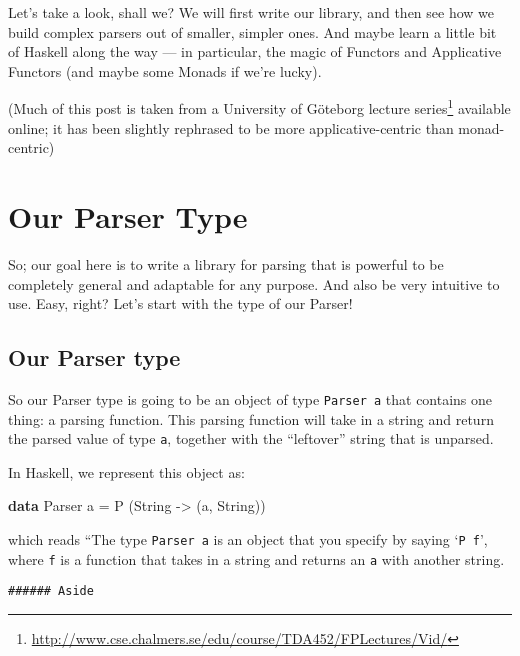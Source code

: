 \documentclass[]{article}
\newenvironment{Shaded}{}{}
\newcommand{\KeywordTok}[1]{\textcolor[rgb]{0.00,0.44,0.13}{\textbf{{#1}}}}
\newcommand{\DataTypeTok}[1]{\textcolor[rgb]{0.56,0.13,0.00}{{#1}}}
\newcommand{\OtherTok}[1]{\textcolor[rgb]{0.00,0.44,0.13}{{#1}}}
\newcommand{\FunctionTok}[1]{\textcolor[rgb]{0.02,0.16,0.49}{{#1}}}
\newcommand{\NormalTok}[1]{{#1}}
\renewcommand{\href}[2]{#2\footnote{\url{#1}}}
\begin{document}
Let's take a look, shall we? We will first write our library, and then see how we build complex
parsers out of smaller, simpler ones. And maybe learn a little bit of Haskell along the way --- in
particular, the magic of Functors and Applicative Functors (and maybe some Monads if we're lucky).

(Much of this post is taken from a University of Göteborg
\href{http://www.cse.chalmers.se/edu/course/TDA452/FPLectures/Vid/}{lecture series} available
online; it has been slightly rephrased to be more applicative-centric than monad-centric)

\section{Our Parser Type}\label{our-parser-type}

So; our goal here is to write a library for parsing that is powerful to be completely general and
adaptable for any purpose. And also be very intuitive to use. Easy, right? Let's start with the type
of our Parser!

\subsection{Our Parser type}\label{our-parser-type-1}

So our Parser type is going to be an object of type \texttt{Parser\ a} that contains one thing: a
parsing function. This parsing function will take in a string and return the parsed value of type
\texttt{a}, together with the ``leftover'' string that is unparsed.

In Haskell, we represent this object as:

\begin{Shaded}
\begin{Highlighting}[]
\KeywordTok{data} \DataTypeTok{Parser} \NormalTok{a }\FunctionTok{=} \DataTypeTok{P} \NormalTok{(}\DataTypeTok{String} \OtherTok{->} \NormalTok{(a, }\DataTypeTok{String}\NormalTok{))}
\end{Highlighting}
\end{Shaded}

which reads ``The type \texttt{Parser\ a} is an object that you specify by saying `\texttt{P\ f}',
where \texttt{f} is a function that takes in a string and returns an \texttt{a} with another string.

\begin{verbatim}
###### Aside
\end{verbatim}
\end{document}
